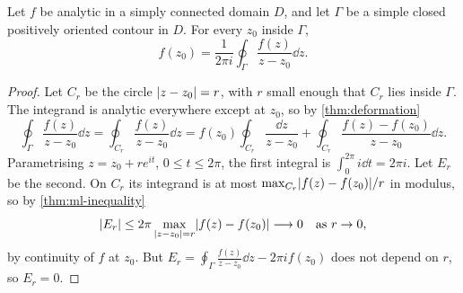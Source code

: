 \begin{theorem}\label{thm:cif}
  Let $f$ be analytic in a simply connected domain $D$, and let $\Gamma$ be a
  simple closed positively oriented contour in $D$. For every $z_0$ inside
  $\Gamma$,
  \[
    f(z_0) = \frac{1}{2\pi i} \oint_\Gamma \frac{f(z)}{z - z_0} \dd z.
  \]
\end{theorem}

\begin{proof}
  Let $C_r$ be the circle $\lvert z - z_0\rvert = r$, with $r$ small enough that
  $C_r$ lies inside $\Gamma$. The integrand is analytic everywhere except at
  $z_0$, so by \cref{thm:deformation}
  \[
    \oint_\Gamma \frac{f(z)}{z - z_0} \dd z
    = \oint_{C_r} \frac{f(z)}{z - z_0} \dd z
    = f(z_0) \oint_{C_r} \frac{\dd z}{z - z_0}
      + \oint_{C_r} \frac{f(z) - f(z_0)}{z - z_0} \dd z.
  \]
  Parametrising $z = z_0 + re^{it}$, $0 \leq t \leq 2\pi$, the first integral
  is $\int_0^{2\pi} i \dd t = 2\pi i$. Let $E_r$ be the second. On $C_r$ its
  integrand is at most $\max_{C_r} \lvert f(z) - f(z_0)\rvert / r$ in modulus, so by
  \cref{thm:ml-inequality}
  \[
    \lvert E_r\rvert \leq 2\pi \max_{\lvert z - z_0\rvert = r} \lvert f(z) - f(z_0)\rvert
    \longrightarrow 0
    \quad \text{as } r \to 0,
  \]
  by continuity of $f$ at $z_0$. But $E_r = \oint_\Gamma \frac{f(z)}{z - z_0}
  \dd z - 2\pi i f(z_0)$ does not depend on $r$, so $E_r = 0$.
\end{proof}
